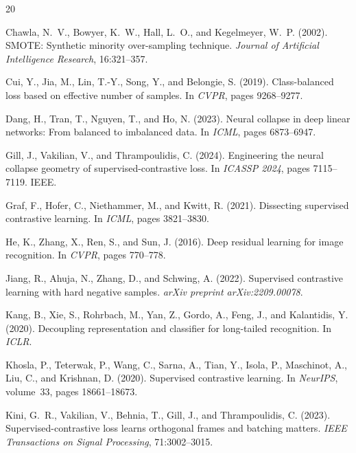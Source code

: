 \documentclass{article}
\begin{document}

\begin{thebibliography}{20}

Chawla, N.~V., Bowyer, K.~W., Hall, L.~O., and Kegelmeyer, W.~P. (2002).
\newblock SMOTE: Synthetic minority over-sampling technique.
\newblock \emph{Journal of Artificial Intelligence Research}, 16:321--357.

Cui, Y., Jia, M., Lin, T.-Y., Song, Y., and Belongie, S. (2019).
\newblock Class-balanced loss based on effective number of samples.
\newblock In \emph{CVPR}, pages 9268--9277.

Dang, H., Tran, T., Nguyen, T., and Ho, N. (2023).
\newblock Neural collapse in deep linear networks: From balanced to imbalanced data.
\newblock In \emph{ICML}, pages 6873--6947.

Gill, J., Vakilian, V., and Thrampoulidis, C. (2024).
\newblock Engineering the neural collapse geometry of supervised-contrastive loss.
\newblock In \emph{ICASSP 2024}, pages 7115--7119. IEEE.

Graf, F., Hofer, C., Niethammer, M., and Kwitt, R. (2021).
\newblock Dissecting supervised contrastive learning.
\newblock In \emph{ICML}, pages 3821--3830.

He, K., Zhang, X., Ren, S., and Sun, J. (2016).
\newblock Deep residual learning for image recognition.
\newblock In \emph{CVPR}, pages 770--778.

Jiang, R., Ahuja, N., Zhang, D., and Schwing, A. (2022).
\newblock Supervised contrastive learning with hard negative samples.
\newblock \emph{arXiv preprint arXiv:2209.00078}.

Kang, B., Xie, S., Rohrbach, M., Yan, Z., Gordo, A., Feng, J., and Kalantidis, Y. (2020).
\newblock Decoupling representation and classifier for long-tailed recognition.
\newblock In \emph{ICLR}.

Khosla, P., Teterwak, P., Wang, C., Sarna, A., Tian, Y., Isola, P., Maschinot, A., Liu, C., and Krishnan, D. (2020).
\newblock Supervised contrastive learning.
\newblock In \emph{NeurIPS}, volume~33, pages 18661--18673.

Kini, G.~R., Vakilian, V., Behnia, T., Gill, J., and Thrampoulidis, C. (2023).
\newblock Supervised-contrastive loss learns orthogonal frames and batching matters.
\newblock \emph{IEEE Transactions on Signal Processing}, 71:3002--3015.


\end{thebibliography}
\end{document}
